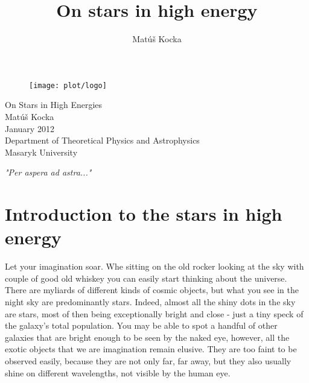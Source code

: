 \documentclass[oneside,a4paper,11pt]{report}
\title{On stars in high energy }
\author{Matúš Kocka}
\begin{document}
\thispagestyle{empty}
\begin{figure}
\begin{center}
\texttt{[image: plot/logo]}
\end{center}
\end{figure}
\begin{center}

\vspace{2cm}
\Large 

\Huge On Stars in High Energies \\
\vspace{1cm}
\Large Matúš Kocka \\
\Large January 2012 \\
\vspace{2cm}
\LARGE Department of Theoretical Physics and Astrophysics \\
Masaryk University
\end{center}
\pagebreak




\newpage
\textit{"Per aspera ad astra..."}

\pagebreak
\tableofcontents

\chapter{Introduction to the stars in high energy }

Let your imagination soar. 
Whe sitting on the old rocker looking at the sky with couple of good old whiskey you can easily 
start thinking about the universe. 
There are myliards of different kinds of cosmic objects, but what you see in the night sky are predominantly stars.
Indeed, almost all the shiny dots in the sky are stars, most of then being exceptionally bright and close - just a tiny
speck of the galaxy's total population. You may be able to spot a handful of other galaxies that are bright enough to 
be seen by the naked eye, however, all the exotic objects that we are imagination remain elusive.  
They are too faint to be observed easily, because they are not only far, far away, but they also usually shine 
on different wavelengths, not visible by the human eye.
\end{document}

